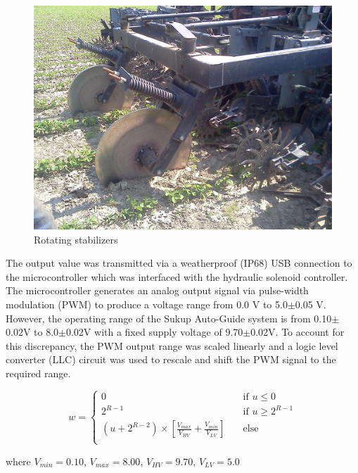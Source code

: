 \documentclass[authoryear]{elsarticle}
\begin{document}
\begin{figure}
  \centering
  \includegraphics[scale=0.1,natwidth=610,natheight=642]{stabilizers.jpg}
  \caption{Rotating stabilizers}
  \label{fig:stabilizers}
\end{figure}

The output value was transmitted via a weatherproof (IP68) USB
connection to the microcontroller which was interfaced with the
hydraulic solenoid controller. The microcontroller generates an analog
output signal via pulse-width modulation (PWM) to produce a voltage
range from 0.0 V to 5.0$\pm$0.05 V. However, the operating range of the
Sukup Auto-Guide system is from 0.10$\pm$0.02V to 8.0$\pm$0.02V with a fixed
supply voltage of 9.70$\pm$0.02V. To account for this discrepancy, the PWM
output range was scaled linearly and a logic level converter (LLC)
circuit was used to rescale and shift the PWM signal to the required
range.

\begin{equation}
  w = 
  \begin{cases}
    0 & \quad \text{if } u \leq 0 \\
    2^{R-1} & \quad \text{if } u \geq 2^{R-1}\\
    (u +2^{R-2})\times\left[\frac{V_{max}}{V_{HV}}+\frac{V_{min}}{V_{LV}}\right] & \quad \text{else} \\
  \end{cases}
  \label{eq:v_out}
\end{equation}
\begin{flushleft}
where $V_{min}=0.10$, $V_{max}=8.00$, $V_{HV}=9.70$, $V_{LV}=5.0$
\end{flushleft}
\end{document}
